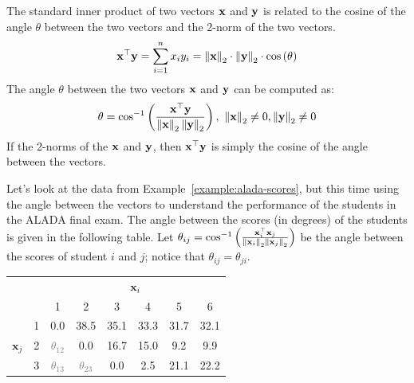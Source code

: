 The standard inner product of two vectors $\mathbf{x}$ and $\mathbf{y}$ is related to the cosine of the angle $\theta$ between the two vectors and the 2-norm of the two vectors.
\[ \mathbf{x}^\top\mathbf{y} = \sum_{i=1}^n x_i y_i = \left\lVert \mathbf{x} \right\rVert_2 \cdot \left\lVert \mathbf{y} \right\rVert_2 \cdot \cos\left( \theta\right) \]
The angle $\theta$ between the two vectors $\mathbf{x}$ and $\mathbf{y}$ can be computed as:
\[ \theta = \cos^{-1}\left( \frac{\mathbf{x}^\top \mathbf{y}}{\left\lVert \mathbf{x} \right\rVert_2 \left\lVert \mathbf{y} \right\rVert_2}\right), \,\, \left\lVert \mathbf{x} \right\rVert_2 \neq 0, \left\lVert \mathbf{y} \right\rVert_2 \neq 0 \]
If the 2-norms of the $\mathbf{x}$ and $\mathbf{y}$, then $\mathbf{x}^\top\mathbf{y}$ is simply the cosine of the angle between the vectors.

\begin{boxedstuff}
    \begin{example}
        Let's look at the data from Example~\ref{example:alada-scores}, but this time using the angle between the vectors to understand the performance of the students in the ALADA final exam. The angle between the scores (in degrees) of the students is given in the following table. Let $\theta_{ij} = \cos^{-1}\left( \frac{\mathbf{x}_i^\top\mathbf{x}_j}{\left\lVert \mathbf{x}_i \right\rVert_2 \left\lVert \mathbf{x}_j \right\rVert_2}\right)$ be the angle between the scores of student $i$ and $j$; notice that $\theta_{ij} = \theta_{ji}$.
        \begin{small}
            \begin{center}
            \begin{tabular}{lc|cccccc|}
                \cline{3-8}
                & \multicolumn{1}{l|}{} & \multicolumn{6}{c|}{$\mathbf{x}_i$} \\ \cline{3-8} 
                &  & \multicolumn{1}{c|}{1} & \multicolumn{1}{c|}{2} & \multicolumn{1}{c|}{3} & \multicolumn{1}{c|}{4} & \multicolumn{1}{c|}{5} & 6 \\ \hline
                \multicolumn{1}{|l|}{\multirow{6}{*}{$\mathbf{x}_j$}} & 1 & \multicolumn{1}{c|}{0.0} & \multicolumn{1}{c|}{38.5} & \multicolumn{1}{c|}{35.1} & \multicolumn{1}{c|}{33.3} & \multicolumn{1}{c|}{31.7} & 32.1 \\ \cline{2-8} 
                \multicolumn{1}{|l|}{} & 2 & \multicolumn{1}{c|}{\textcolor{gray}{$\theta_{12}$}} & \multicolumn{1}{c|}{0.0} & \multicolumn{1}{c|}{16.7} & \multicolumn{1}{c|}{15.0} & \multicolumn{1}{c|}{9.2} & 9.9 \\ \cline{2-8} 
                \multicolumn{1}{|l|}{} & 3 & \multicolumn{1}{c|}{\textcolor{gray}{$\theta_{13}$}} & \multicolumn{1}{c|}{\textcolor{gray}{$\theta_{23}$}} & \multicolumn{1}{c|}{0.0} & \multicolumn{1}{c|}{2.5} & \multicolumn{1}{c|}{21.1} & 22.2 \\ \cline{2-8} 

\end{tabular}
\end{center}
\end{small}
\end{example}
\end{boxedstuff}
